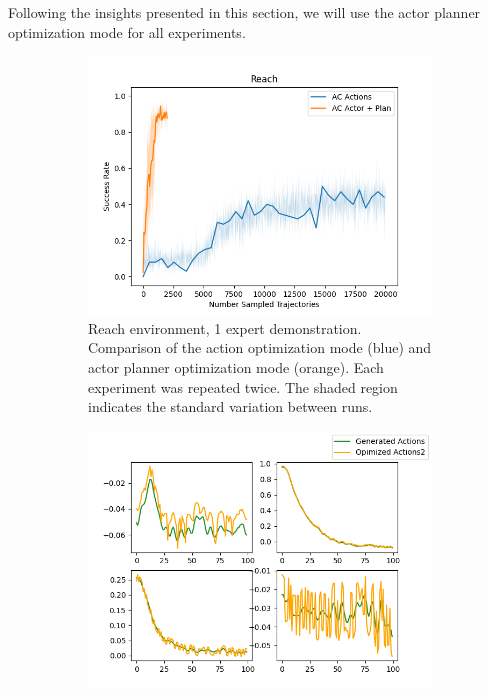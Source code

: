 Following the insights presented in this section, we will use the actor planner optimization mode for all experiments.

\begin{figure}[htbp]
    \centering
    \begin{subfigure}[t]{0.65\textwidth}
      \includegraphics[width=\textwidth]{images/Plan_vs_Actions/Reach.png}
      \caption{Reach environment, 1 expert demonstration. Comparison of the action optimization mode (blue) and actor planner optimization mode (orange).
      Each experiment was repeated twice. The shaded region indicates the standard variation between runs. }
      \label{fig:plot1}
    \end{subfigure}
    \medskip
    \begin{subfigure}[t]{0.45\textwidth}
      \includegraphics[width=\textwidth]{images/Plan_vs_Actions/changes/actions_1.png}

\end{subfigure}
\end{figure}
